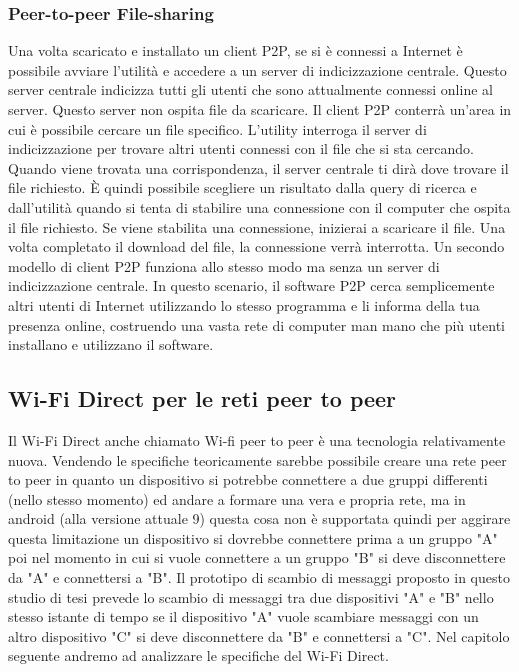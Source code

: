\subsubsection{Peer-to-peer File-sharing}
Una volta scaricato e installato un client P2P, se si è connessi a Internet è
possibile avviare l'utilità e accedere a un server di indicizzazione centrale.
Questo server centrale indicizza tutti gli utenti che sono attualmente connessi
online al server. Questo server non ospita file da scaricare. Il client P2P
conterrà un'area in cui è possibile cercare un file specifico. L'utility
interroga il server di indicizzazione per trovare altri utenti connessi con il
file che si sta cercando. Quando viene trovata una corrispondenza, il server
centrale ti dirà dove trovare il file richiesto. È quindi possibile scegliere
un risultato dalla query di ricerca e dall'utilità quando si tenta di stabilire
una connessione con il computer che ospita il file richiesto. Se viene
stabilita una connessione, inizierai a scaricare il file. Una volta completato
il download del file, la connessione verrà interrotta.
Un secondo modello di client P2P funziona allo stesso modo ma senza un server
di indicizzazione centrale. In questo scenario, il software P2P cerca
semplicemente altri utenti di Internet utilizzando lo stesso programma e li
informa della tua presenza online, costruendo una vasta rete di computer man
mano che più utenti installano e utilizzano il software.

\subsection{Wi-Fi Direct per le reti peer to peer}

Il Wi-Fi Direct anche chiamato Wi-fi peer to peer è una tecnologia
relativamente nuova.
Vendendo le specifiche teoricamente sarebbe possibile creare una rete
peer to peer in quanto un dispositivo si potrebbe connettere a due
gruppi differenti (nello stesso momento) ed andare a formare una
vera e propria rete,
ma in android (alla versione attuale 9) questa cosa non è supportata
quindi per aggirare questa limitazione un dispositivo si dovrebbe
connettere prima a un gruppo "A" poi nel momento in cui si vuole
connettere a un gruppo "B"
si deve disconnettere da "A" e connettersi a "B".
Il prototipo di scambio di messaggi proposto in questo studio di
tesi prevede lo scambio di messaggi tra due dispositivi "A" e "B"
nello stesso istante di
tempo se il dispositivo "A" vuole scambiare messaggi con un altro dispositivo "C"
si deve disconnettere da "B" e connettersi a "C".
Nel capitolo seguente andremo ad analizzare le specifiche del Wi-Fi Direct.


